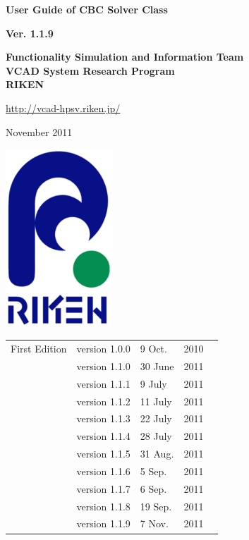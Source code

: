 \documentclass[a4paper,10pt,oneside,fleqn]{jsbook}
\begin{document}
\begin{titlepage}
\begin{center}
\vspace*{3cm}
{\huge \textbf{User Guide of CBC Solver Class}}\\
\vspace{1cm}

{\large \textbf{Ver. 1.1.9}}\\
\vspace{1.5cm}

{\large \textbf{Functionality Simulation and Information Team}\\
\large \textbf{VCAD System Research Program}\\
\large \textbf{RIKEN}\\
\vspace{1cm}
}


\url{http://vcad-hpsv.riken.jp/}\\
\vspace{1cm}

November 2011\\
\vspace{4cm}

\includegraphics[width=4cm,bb=-80 0 220 500]{RIKEN_logo_300x500.eps}

\end{center}
\end{titlepage}
\newpage

%
\frontmatter

\begin{tabular}{llllr}
First Edition  &  version 1.0.0  &  9 Oct.  & 2010\\
               &  version 1.1.0  & 30 June  & 2011\\
               &  version 1.1.1  &  9 July  & 2011\\
               &  version 1.1.2  & 11 July  & 2011\\
               &  version 1.1.3  & 22 July  & 2011\\
               &  version 1.1.4  & 28 July  & 2011\\
               &  version 1.1.5  & 31 Aug.  & 2011\\
               &  version 1.1.6  &  5 Sep.  & 2011\\
               &  version 1.1.7  &  6 Sep.  & 2011\\
               &  version 1.1.8  & 19 Sep.  & 2011\\
               &  version 1.1.9  &  7 Nov.  & 2011
               

\end{tabular}
\end{document}
